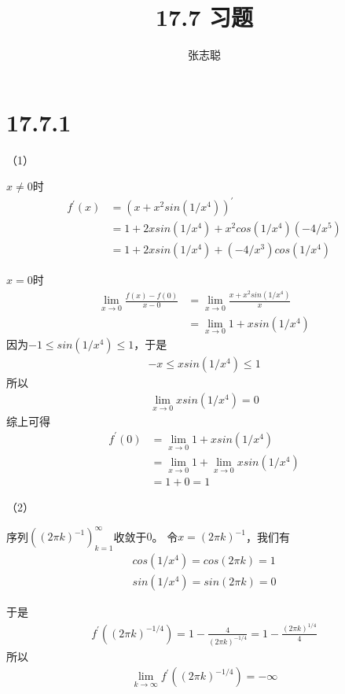 \documentclass{article}
\begin{document}
\title{17.7 习题}
\author{张志聪}
\maketitle

\section*{17.7.1}

（1）

$x \neq 0$时
\begin{align*}
  f^\prime(x) & = (x + x^2sin(1/x^4))^\prime               \\
              & = 1 + 2xsin(1/x^4) + x^2cos(1/x^4)(-4/x^5) \\
              & = 1 + 2xsin(1/x^4) + (-4/x^3)cos(1/x^4)
\end{align*}

$x = 0$时
\begin{align*}
  \lim\limits_{x \to 0} \frac{f(x) - f(0)}{x - 0}
   & = \lim\limits_{x \to 0} \frac{x + x^2sin(1/x^4)}{x} \\
   & = \lim\limits_{x \to 0} 1 + xsin(1/x^4)
\end{align*}
因为$-1 \leq sin(1/x^4) \leq 1$，于是
\begin{align*}
  -x \leq xsin(1/x^4) \leq 1
\end{align*}
所以
\begin{align*}
  \lim\limits_{x \to 0} xsin(1/x^4) = 0
\end{align*}
综上可得
\begin{align*}
  f^\prime(0)
   & = \lim\limits_{x \to 0} 1 + xsin(1/x^4)                       \\
   & = \lim\limits_{x \to 0} 1 + \lim\limits_{x \to 0} xsin(1/x^4) \\
   & = 1 + 0 = 1
\end{align*}

（2）

序列$((2\pi k)^{-1})_{k = 1}^\infty$收敛于$0$。
令$x = (2\pi k)^{-1}$，我们有
\begin{align*}
  cos(1/x^4) =  cos(2 \pi k) = 1 \\
  sin(1/x^4) =  sin(2 \pi k) = 0
\end{align*}

于是
\begin{align*}
  f^\prime((2 \pi k)^{-1/4}) = 1 - \frac{4}{(2 \pi k)^{-1/4}} = 1 - \frac{(2 \pi k)^{1/4}}{4}
\end{align*}
所以
\begin{align*}
  \lim\limits_{k \to \infty} f^\prime((2 \pi k)^{-1/4}) = -\infty
\end{align*}
\end{document}
